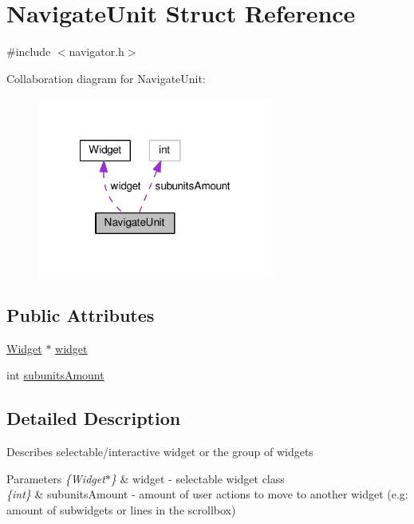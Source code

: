 \hypertarget{struct_navigate_unit}{\section{Navigate\-Unit Struct Reference}
\label{struct_navigate_unit}
}


{\ttfamily \#include $<$navigator.\-h$>$}



Collaboration diagram for Navigate\-Unit\-:
\nopagebreak
\begin{figure}[H]
\begin{center}
\leavevmode
\includegraphics[width=221pt]{struct_navigate_unit__coll__graph}
\end{center}
\end{figure}
\subsection*{Public Attributes}
\begin{DoxyCompactItemize}
\item 
\hyperlink{class_widget}{Widget} $\ast$ \hyperlink{struct_navigate_unit_a04a97a78df45d0f2268b8352f64d43f5}{widget}
\item 
int \hyperlink{struct_navigate_unit_a59e42d03540ccad6017bc708cab71893}{subunits\-Amount}
\end{DoxyCompactItemize}


\subsection{Detailed Description}
Describes selectable/interactive widget or the group of widgets 
\begin{DoxyParams}{Parameters}
{\em \{\-Widget$\ast$\}} & widget -\/ selectable widget class \\
\hline
{\em \{int\}} & subunits\-Amount -\/ amount of user actions to move to another widget (e.\-g\-: amount of subwidgets or lines in the scrollbox) \\
\hline
\end{DoxyParams}


